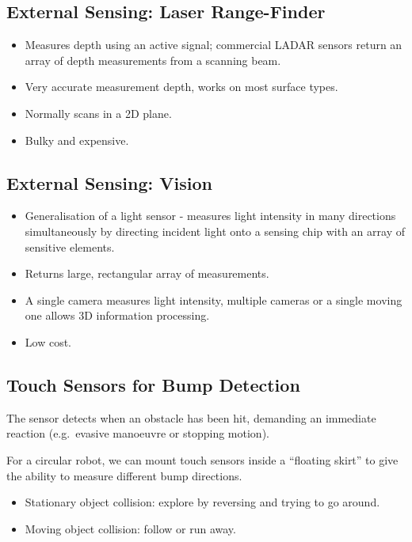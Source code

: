 \documentclass[11pt]{article}
\begin{document}
\subsection{External Sensing: Laser Range-Finder}
\begin{itemize}
  \item Measures depth using an active signal; commercial LADAR sensors return an array of depth measurements from a scanning beam.
  \item Very accurate measurement depth, works on most surface types.
  \item Normally scans in a 2D plane.
  \item Bulky and expensive.
\end{itemize}

\subsection{External Sensing: Vision}
\begin{itemize}
  \item Generalisation of a light sensor - measures light intensity in many directions simultaneously by directing incident light onto a sensing chip with an array of sensitive elements.
  \item Returns large, rectangular array of measurements.
  \item A single camera measures light intensity, multiple cameras or a single moving one allows 3D information processing.
  \item Low cost.
\end{itemize}

\subsection{Touch Sensors for Bump Detection}
The sensor detects when an obstacle has been hit, demanding an immediate reaction (e.g.\ evasive manoeuvre or stopping motion).

For a circular robot, we can mount touch sensors inside a ``floating skirt'' to give the ability to measure different bump directions.

\begin{itemize}
  \item Stationary object collision: explore by reversing and trying to go around.
  \item Moving object collision: follow or run away.
\end{itemize}
\end{document}
